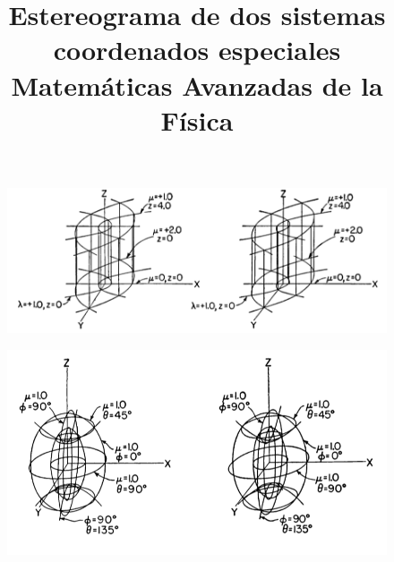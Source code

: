 
\author{}
\title{Estereograma de dos sistemas coordenados especiales \\ {\large Matemáticas Avanzadas de la Física}}
\date{}
\author{}

\begin{landscape}
\maketitle
\fontsize{14}{14}\selectfont
\begin{figure}[H]
    \hspace*{-2cm}
    \centering    
    \includegraphics[scale=0.75]{Imagenes/Estereograma_01_Cilindrico_Eliptico.png}
\end{figure}
\newpage
\begin{figure}[H]
    \centering    
    \includegraphics[scale=0.75]{Imagenes/Estereograma_02_Prolato.png}
\end{figure}
\end{landscape}

